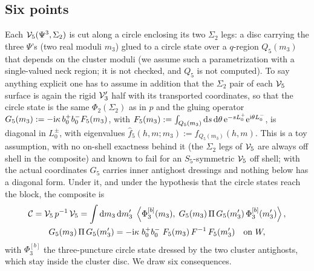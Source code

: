 \subsection{Six points}
\label{icg:sec:six-points}

Each ${\mathcal{V}}_5(\Psi^3, \Sigma_2)$ is cut along a circle enclosing its two $\Sigma_2$ legs: a disc carrying the three $\Psi$'s (two real moduli $m_3$) glued to a circle state over a $q$-region $Q_5(m_3)$ that depends on the cluster moduli (we assume such a parametrization with a single-valued neck region; it is not checked, and $Q_5$ is not computed).
To say anything explicit one has to assume in addition that the $\Sigma_2$ pair of each ${\mathcal{V}}_5$ surface is again the rigid ${\mathcal{V}}_3'$ half with its transported coordinates, so that the circle state is the same $\Phi_2(\Sigma_2)$ as in $p$ and the gluing operator $G_5(m_3) := -\mathrm{i}\kappa\, b_0^+ b_0^- F_5(m_3)$, with $F_5(m_3) := \int_{Q_5(m_3)} \mathrm{d} s \, \mathrm{d}\theta \, \mathrm{e}^{-s L_0^+} \mathrm{e}^{\mathrm{i}\theta L_0^-}$, is diagonal in $L_0^\pm$, with eigenvalues $\hat f_5(h, m; m_3) := \hat f_{Q_5(m_3)}(h, m)$.
This is a toy assumption, with no on-shell exactness behind it (the $\Sigma_2$ legs of ${\mathcal{V}}_5$ are always off shell in the composite) and known to fail for an $S_5$-symmetric ${\mathcal{V}}_5$ off shell; with the actual coordinates $G_5$ carries inner antighost dressings and nothing below has a diagonal form.
Under it, and under the hypothesis that the circle states reach the block, the composite is
\begin{gather}
  \label{icg:eq:composite}
  {\mathcal{C}}
    = {\mathcal{V}}_5 \, p^{-1} \, {\mathcal{V}}_5
    = \int \mathrm{d} m_3 \, \mathrm{d} m_3' \;
      \Braket{\Phi_3^{[b]}(m_3), \; G_5(m_3) \, \Pi \, G_5(m_3') \, \Phi_3^{[b]}(m_3')},
  \\
  \label{icg:eq:composite-block}
  G_5(m_3) \, \Pi \, G_5(m_3')
    = - \mathrm{i}\kappa \; b_0^+ b_0^- \; F_5(m_3) \, F^{-1} \, F_5(m_3')
  \quad \text{on } W,
\end{gather}
with $\Phi_3^{[b]}$ the three-puncture circle state dressed by the two cluster antighosts, which stay inside the cluster disc.
We draw six consequences.

